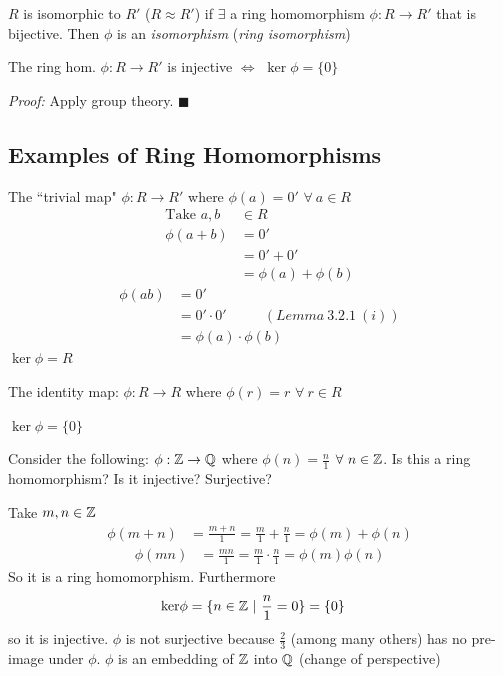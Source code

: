 \begin{definition}\label{def:ring-iso}
    $R$ is isomorphic to $R'$ ($R\approx R'$) if $\exists$ a ring homomorphism
    $\phi : R \rightarrow R'$ that is bijective. Then $\phi$ is an \textit{isomorphism}
    (\textit{ring isomorphism})
\end{definition}

\begin{lemma}
    The ring hom. $\phi : R \rightarrow R'$ is injective $\iff$ $\ker\phi = \{0\}$ \steezybreak

    \noindent \textit{Proof:} Apply group theory. $\blacksquare$
\end{lemma}
\subsection*{Examples of Ring Homomorphisms}
\begin{example}
    The ``trivial map" $\phi: R \rightarrow R'$ where $\phi(a)=0'$ $\forall \ a \in R$
    \begin{align}
        \text{Take }a,b \ & \in R \nonumber \\
        \phi(a+b)&= 0' \nonumber \\
        &= 0' + 0' \nonumber \\
        &= \phi(a) + \phi(b) \nonumber
    \end{align}
    \begin{align}
        \phi(ab)&= 0' \nonumber \\
        &= 0'\cdot 0' \ \ \ \ \ \ \ \ \ \ \ \ (Lemma \ 3.2.1 \ (i)) \nonumber \\
        &= \phi(a)\cdot \phi(b) \nonumber
    \end{align}
    $\ker\phi = R$
\end{example}

\begin{example}
    The identity map: $\phi : R \rightarrow R$ where $\phi(r)=r$ $\forall \ r \in R$ \steezybreak

    \noindent $\ker\phi = \{0\}$
\end{example}

\begin{example}
Consider the following: $\phi: {\mathbb{Z}} \rightarrow {\mathbb{Q}}$ where $\phi(n) = \frac{n}{1}$
$\forall \ n \in {\mathbb{Z}}$. Is this a ring homomorphism? Is it injective? Surjective?

Take $m,n \in {\mathbb{Z}}$
\begin{align}
    \phi(m+n) &= \frac{m+n}{1} = \frac{m}{1}+\frac{n}{1}= \phi(m)+\phi(n) \nonumber
\end{align}
\begin{align}
    \phi(mn) &= \frac{mn}{1} = \frac{m}{1}\cdot\frac{n}{1}= \phi(m)\phi(n) \nonumber
\end{align}
So it is a ring homomorphism. Furthermore
\begin{align}
    \text{ker} \phi &= \{n\in{\mathbb{Z}} \ | \ \frac{n}{1}=0\} = \{0\} \nonumber
\end{align}
so it is injective. $\phi$ is not surjective because $\frac{2}{3}$ (among many others) has no
pre-image under $\phi$. $\phi$ is an embedding of ${\mathbb{Z}}$ into ${\mathbb{Q}}$ (change of perspective)
\end{example}

